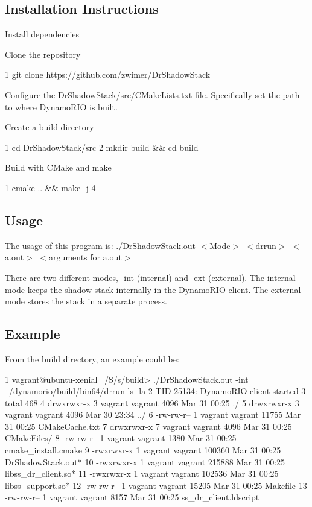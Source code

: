 \subsection*{Installation Instructions}


\begin{DoxyEnumerate}
\item Install dependencies
\item Clone the repository 
\begin{DoxyCode}
1 git clone https://github.com/zwimer/DrShadowStack
\end{DoxyCode}

\item Configure the {\ttfamily Dr\+Shadow\+Stack/src/\+C\+Make\+Lists.\+txt} file. Specifically set the path to where Dynamo\+R\+IO is built.
\item Create a build directory 
\begin{DoxyCode}
1 cd DrShadowStack/src
2 mkdir build && cd build
\end{DoxyCode}

\item Build with C\+Make and make 
\begin{DoxyCode}
1 cmake .. && make -j 4
\end{DoxyCode}

\end{DoxyEnumerate}

\subsection*{Usage}

The usage of this program is\+: {\ttfamily ./\+Dr\+Shadow\+Stack.out $<$Mode$>$ $<$drrun$>$ $<$a.\+out$>$ $<$arguments for a.\+out$>$}

There are two different modes, {\ttfamily -\/int} (internal) and {\ttfamily -\/ext} (external). The internal mode keeps the shadow stack internally in the Dynamo\+R\+IO client. The external mode stores the stack in a separate process.

\subsection*{Example}

From the build directory, an example could be\+: 
\begin{DoxyCode}
1 vagrant@ubuntu-xenial ~/S/s/build> ./DrShadowStack.out -int ~/dynamorio/build/bin64/drrun ls -la
2 TID 25134: DynamoRIO client started
3 total 468
4 drwxrwxr-x 3 vagrant vagrant   4096 Mar 31 00:25 ./
5 drwxrwxr-x 3 vagrant vagrant   4096 Mar 30 23:34 ../
6 -rw-rw-r-- 1 vagrant vagrant  11755 Mar 31 00:25 CMakeCache.txt
7 drwxrwxr-x 7 vagrant vagrant   4096 Mar 31 00:25 CMakeFiles/
8 -rw-rw-r-- 1 vagrant vagrant   1380 Mar 31 00:25 cmake\_install.cmake
9 -rwxrwxr-x 1 vagrant vagrant 100360 Mar 31 00:25 DrShadowStack.out*
10 -rwxrwxr-x 1 vagrant vagrant 215888 Mar 31 00:25 libss\_dr\_client.so*
11 -rwxrwxr-x 1 vagrant vagrant 102536 Mar 31 00:25 libss\_support.so*
12 -rw-rw-r-- 1 vagrant vagrant  15205 Mar 31 00:25 Makefile
13 -rw-rw-r-- 1 vagrant vagrant   8157 Mar 31 00:25 ss\_dr\_client.ldscript
\end{DoxyCode}


